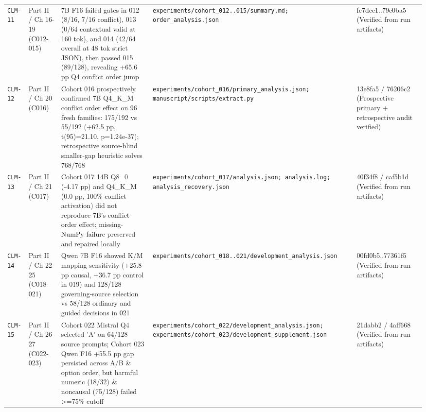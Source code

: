 {\begin{longtable}{@{}>{\raggedright\arraybackslash}p{1.2cm}>{\raggedright\arraybackslash}p{2.0cm}>{\raggedright\arraybackslash}p{4.8cm}>{\raggedright\arraybackslash}p{3.9cm}>{\raggedright\arraybackslash}p{2.5cm}@{}}
\texttt{CLM-\allowbreak{}11} & Part II /\allowbreak{} Ch 16-\allowbreak{}19 (C012-\allowbreak{}015) & 7B F16 failed gates in 012 (8/\allowbreak{}16, 7/\allowbreak{}16 conflict), 013 (0/\allowbreak{}64 contextual valid at 160 tok), and 014 (42/\allowbreak{}64 overall at 48 tok strict JSON), then passed 015 (89/\allowbreak{}128), revealing +65.6 pp Q4 conflict order jump & \texttt{experiments/\allowbreak{}cohort\_012..015/\allowbreak{}summary.md; order\_analysis.json} & fc7dcc1..79c0ba5 (Verified from run artifacts) \\[2pt]
\texttt{CLM-\allowbreak{}12} & Part II /\allowbreak{} Ch 20 (C016) & Cohort 016 prospectively confirmed 7B Q4\_K\_M conflict order effect on 96 fresh families: 175/\allowbreak{}192 vs 55/\allowbreak{}192 (+62.5 pp, t(95)=21.10, p=1.24e-\allowbreak{}37); retrospective source-\allowbreak{}blind smaller-\allowbreak{}gap heuristic solves 768/\allowbreak{}768 & \texttt{experiments/\allowbreak{}cohort\_016/\allowbreak{}primary\_analysis.json; manuscript/\allowbreak{}scripts/\allowbreak{}extract.py} & 13e8fa5 /\allowbreak{} 76206c2 (Prospective primary + retrospective audit verified) \\[2pt]
\texttt{CLM-\allowbreak{}13} & Part II /\allowbreak{} Ch 21 (C017) & Cohort 017 14B Q8\_0 (-\allowbreak{}4.17 pp) and Q4\_K\_M (0.0 pp, 100\% conflict activation) did not reproduce 7B's conflict-\allowbreak{}order effect; missing-\allowbreak{}NumPy failure preserved and repaired locally & \texttt{experiments/\allowbreak{}cohort\_017/\allowbreak{}analysis.json; analysis.log; analysis\_recovery.json} & 40f34f8 /\allowbreak{} caf5b1d (Verified from run artifacts) \\[2pt]
\texttt{CLM-\allowbreak{}14} & Part II /\allowbreak{} Ch 22-\allowbreak{}25 (C018-\allowbreak{}021) & Qwen 7B F16 showed K/\allowbreak{}M mapping sensitivity (+25.8 pp causal, +36.7 pp control in 019) and 128/\allowbreak{}128 governing-\allowbreak{}source selection vs 58/\allowbreak{}128 ordinary and guided decisions in 021 & \texttt{experiments/\allowbreak{}cohort\_018..021/\allowbreak{}development\_analysis.json} & 00fd0b5..77361f5 (Verified from run artifacts) \\[2pt]
\texttt{CLM-\allowbreak{}15} & Part II /\allowbreak{} Ch 26-\allowbreak{}27 (C022-\allowbreak{}023) & Cohort 022 Mistral Q4 selected 'A' on 64/\allowbreak{}128 source prompts; Cohort 023 Qwen F16 +55.5 pp gap persisted across A/\allowbreak{}B \& option order, but harmful numeric (18/\allowbreak{}32) \& noncausal (75/\allowbreak{}128) failed >=75\% cutoff & \texttt{experiments/\allowbreak{}cohort\_022/\allowbreak{}development\_analysis.json; experiments/\allowbreak{}cohort\_023/\allowbreak{}development\_supplement.json} & 21dabb2 /\allowbreak{} 4aff668 (Verified from run artifacts) \\[2pt]

\end{longtable}}
